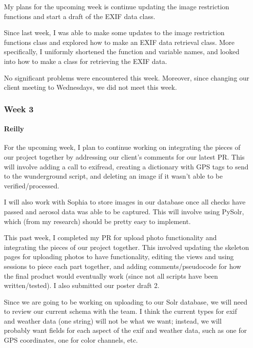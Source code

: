 \documentclass[onecolumn, draftclsnofoot,10pt, compsoc]{IEEEtran}
\begin{document}
\begin{flushleft}
My plans for the upcoming week is continue updating the image restriction functions and start a draft of the EXIF data class.
 
 
Since last week, I was able to make some updates to the image restriction functions class and explored how to make an EXIF data retrieval class. More specifically, I uniformly shortened the function and variable names, and looked into how to make a class for retrieving the EXIF data.
 
 
No significant problems were encountered this week. Moreover, since changing our client meeting to Wednesdays, we did not meet this week.
 
\subsubsection{Week 3}
\paragraph{Reilly}
 
For the upcoming week, I plan to continue working on integrating the pieces of our project together by addressing our client's comments for our latest PR. This will involve adding a call to exifread, creating a dictionary with GPS tags to send to the wunderground script, and deleting an image if it wasn't able to be verified/processed.
 
I will also work with Sophia to store images in our database once all checks have passed and aerosol data was able to be captured. This will involve using PySolr, which (from my research) should be pretty easy to implement.
 
 
This past week, I completed my PR for upload photo functionality and integrating the pieces of our project together. This involved updating the skeleton pages for uploading photos to have functionality, editing the views and using sessions to piece each part together, and adding comments/pseudocode for how the final product would eventually work (since not all scripts have been written/tested). I also submitted our poster draft 2.
 
 
Since we are going to be working on uploading to our Solr database, we will need to review our current schema with the team. I think the current types for exif and weather data (one string) will not be what we want; instead, we will probably want fields for each aspect of the exif and weather data, such as one for GPS coordinates, one for color channels, etc.
 

\end{flushleft}
\end{document}
